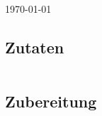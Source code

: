 \documentclass[fontsize=15pt,paper=a4]{scrartcl}
\begin{document}
\section*{}
\vspace{-15pt}
\begin{center}
    \scriptsize \today
\end{center}
%
\subsection*{Zutaten}
\begin{tabularx}{\textwidth}{XX}
    
\end{tabularx}
%
\subsection*{Zubereitung}
\begin{enumerate}
    
\end{enumerate}
%
\end{document}
